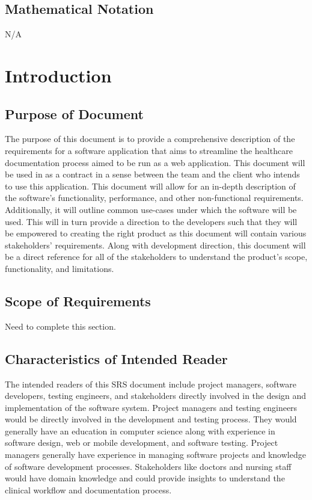 \documentclass[12pt]{article}
\begin{document}
\subsection{Mathematical Notation}
N/A

\newpage



\section{Introduction}

\subsection{Purpose of Document} \label{sec_PurposeOfDocument}

The purpose of this document is to provide a comprehensive description of the requirements for a software application that aims to streamline the healthcare documentation process aimed to be run as a web application. This document will be used in as a contract in a sense between the team and the client who intends to use this application. This document will allow for an in-depth description of the software's functionality, performance, and other non-functional requirements. Additionally, it will outline common use-cases under which the software will be used. This will in turn provide a direction to the developers such that they will be empowered to creating the right product as this document will contain various stakeholders' requirements. Along with development direction, this document will be a direct reference for all of the stakeholders to understand the product's scope, functionality, and limitations.

\subsection{Scope of Requirements} \label{sec_ScopeOfRequirements}

Need to complete this section.



\subsection{Characteristics of Intended Reader} \label{sec_IntendedReader} 

The intended readers of this SRS document include project managers, software developers, testing engineers, and stakeholders directly involved in the design and implementation of the software system. Project managers and testing engineers would be directly involved in the development and testing process. They would generally have an education in computer science along with experience in software design, web or mobile development, and software testing. Project managers generally have experience in managing software projects and knowledge of software development processes. Stakeholders like doctors and nursing staff would have domain knowledge and could provide insights to understand the clinical workflow and documentation process. 
\end{document}

